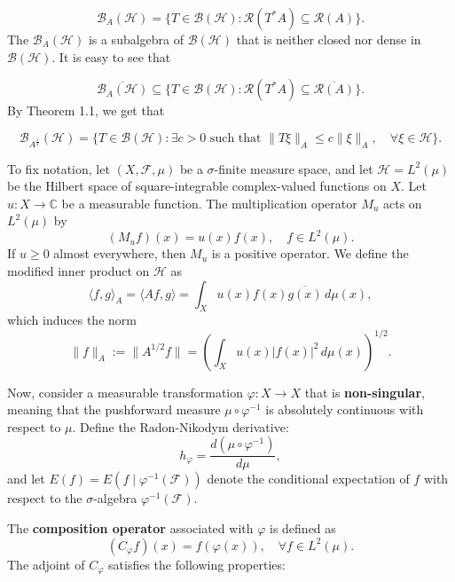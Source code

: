 \documentclass{amsart}
\theoremstyle{definition}\newtheorem{defn}[thm]{Definition}
\theoremstyle{remark}
\numberwithin{equation}{section}
\begin{document}
\[
\mathcal{B}_A(\mathcal{H}) = \{T \in \mathcal{B}(\mathcal{H}) : \mathcal{R}(T^* A) \subseteq \mathcal{R}(A) \}.
\]
The $\mathcal{B}_A(\mathcal{H})$ is a subalgebra of $\mathcal{B}(\mathcal{H})$ that is neither closed nor dense in $\mathcal{B}(\mathcal{H})$. It is easy to see that

\[
\overline{\mathcal{B}_A(\mathcal{H})} \subseteq \{T \in \mathcal{B}(\mathcal{H}) : \mathcal{R}(T^* A) \subseteq \overline{\mathcal{R}(A)} \}.
\]
By Theorem 1.1, we get that

\[
\mathcal{B}_{A^{\frac{1}{2}}}(\mathcal{H}) = \{T \in \mathcal{B}(\mathcal{H}) : \exists c > 0 \text{ such that } \|T\xi\|_A \leq c\|\xi\|_A, \quad \forall \xi \in \mathcal{H} \}.
\]

To fix notation, let \( (X, \mathcal{F}, \mu) \) be a \( \sigma \)-finite measure space, and let \( \mathcal{H} = L^2(\mu) \) be the Hilbert space of square-integrable complex-valued functions on \( X \). Let \( u: X \to \mathbb{C} \) be a measurable function. The multiplication operator \( M_u \) acts on \( L^2(\mu) \) by
\[
(M_u f)(x) = u(x) f(x), \quad f \in L^2(\mu).
\]
If \( u \geq 0 \) almost everywhere, then \( M_u \) is a positive operator. We define the modified inner product on \( \mathcal{H} \) as
\[
\langle f, g \rangle_A = \langle A f, g \rangle = \int_X u(x) f(x) \overline{g(x)} \, d\mu(x),
\]
which induces the norm
\[
\|f\|_A := \|A^{1/2} f\| = \left( \int_X u(x) |f(x)|^2 \, d\mu(x) \right)^{1/2}.
\]

Now, consider a measurable transformation $\varphi: X \to X$ that is \textbf{non-singular}, meaning that the pushforward measure $\mu \circ \varphi^{-1}$ is absolutely continuous with respect to $\mu$. Define the Radon-Nikodym derivative:
\begin{equation}
    h_\varphi = \frac{d(\mu \circ \varphi^{-1})}{d\mu},
\end{equation}
and let $E(f) = E(f \mid \varphi^{-1}(\mathcal{F}))$ denote the conditional expectation of $f$ with respect to the $\sigma$-algebra $\varphi^{-1}(\mathcal{F})$.

The \textbf{composition operator} associated with $\varphi$ is defined as
\begin{equation}
    (C_\varphi f)(x) = f(\varphi(x)), \quad \forall f \in L^2(\mu).
\end{equation}
The adjoint of $C_\varphi$ satisfies the following properties:
\end{document}

